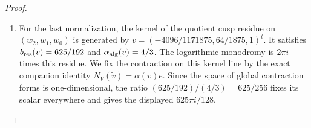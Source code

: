 \begin{proof}
\begin{enumerate}[label={$\langle1\rangle$\arabic*.}]
The extension is nontrivial, since its dual has no common
invariant vector by \cref{night:P1.1}; consequently its coordinate $s$ is nonzero.
Set $t=3125d/60$.  Its full row is
$\beta=s b+t r_0\Gamma_W$.  The constant bundle maps
\[
 C=\begin{pmatrix}1&-t r_0\\0&sI_5\end{pmatrix},\qquad
 C^{-1}=\begin{pmatrix}1&(t/s)r_0\\0&s^{-1}I_5\end{pmatrix}
\]
are holomorphic in the stated root frames and fix the invariant
section $e$.  Direct multiplication gives
\[
 C^{-1}\Gamma_6 C+C^{-1}dC
   =\begin{pmatrix}0&\beta\\0&\Gamma_W\end{pmatrix}.
\]
This proves the required equivalence of the complete flat bundles
with their fixed invariant line.  Evaluation at the marked basepoint
gives a common intertwiner for both specified meridians.  Thus its
existence follows from the exact connection maps.  

\item For the last normalization, the kernel of the quotient cusp residue
on $(w_2,w_1,w_0)$ is generated by
$v=(-4096/1171875,64/1875,1)^t$.
It satisfies $b_{\rm res}(v)=625/192$ and
$\alpha_{\rm alg}(v)=4/3$.
The logarithmic monodromy is $2\pi i$ times this residue.
We fix the contraction on this kernel line by the exact companion identity $N_V(\widetilde v)=\alpha(v)e$.
Since the space of global contraction forms is one-dimensional, the
ratio $(625/192)/(4/3)=625/256$ fixes its scalar everywhere and gives
the displayed $625\pi i/128$.

\end{enumerate}
\end{proof}

